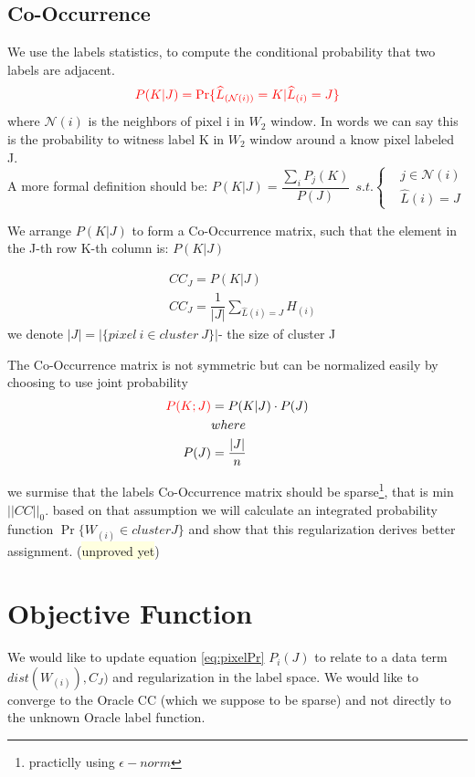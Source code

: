 \documentclass{article}
\begin{document}
\subsection{Co-Occurrence}
We use the labels statistics, to compute the conditional probability that two labels are adjacent.
$$ \color{red}
 P(K|J)=\Pr\{ \widehat{L}_{(\mathcal{N}(i))}=K|\widehat{L}_{(i)}=J \}
$$
where $ \mathcal{N}(i) $ is the neighbors of pixel i in $ W_2 $ window.
In words we can say this is the probability to witness label K in $ W_2 $ window around a know pixel labeled J.\\
A more formal definition should be:  $ P(K|J)=\dfrac{\sum_{i} P _j(K)}{P(J)} \ \ s.t. \begin{cases}
&j \in {\mathcal{N}(i)}\\
&\widehat{L}(i)=J
\end{cases}  $

We arrange $ P(K|J) $ to form a Co-Occurrence matrix, such that the element in the J-th row K-th column is: $ P(K|J) $

\begin{align}
&CC_J= P(K|J)\label{eq:CoOc}\\
&CC_J=\dfrac{1}{|J|} \sum_{\hat{L}(i)=J}H_{(i)}\nonumber
\end{align}
we denote $ |J|=|\{pixel\ i\in cluster\ J\}| $- the size of cluster J

The Co-Occurrence matrix is not symmetric but can be normalized easily by choosing to use joint probability 
\begin{align}
\color{red}
P(K;J)&=P(K|J)\cdot P(J) \label{eq:jointprob}\\
&where\nonumber\\
P(J)&=\dfrac{\vert J\vert}{n} \nonumber
\end{align}


we surmise that the labels Co-Occurrence matrix should be sparse\footnote{practiclly using $ \epsilon-norm $}, that is min $||CC||_0$. based on that assumption we will calculate an integrated probability function $\Pr \{W_{(i)}\in cluster J\}$ and show that this regularization derives better assignment. (\colorbox{lightyellow}{unproved yet})


\section{Objective Function}
We would like to update equation \eqref{eq:pixelPr} $ P_{i}(J) $ to relate to a data term $ dist(W_{(i)} ),C_J) $ and regularization in the label space.
We would like to converge to the Oracle CC (which we suppose to be sparse) and not directly to the unknown Oracle label function.
\end{document}
